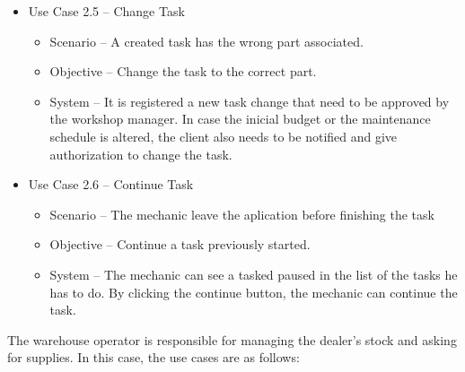 \begin{itemize}
\begin{itemize}
  \end{itemize}
  \item Use Case 2.5 – Change Task
  \begin{itemize}
    \item Scenario – A created task has the wrong part associated.
    \item Objective – Change the task to the correct part.
    \item System – It is registered a new task change that need to be approved by the workshop manager. In case the inicial budget or the maintenance schedule is altered, the client also needs to be notified and give authorization to change the task.
  \end{itemize}
    \item Use Case 2.6 – Continue Task
  \begin{itemize}
    \item Scenario – The mechanic leave the aplication before finishing the task
    \item Objective – Continue a task previously started.
    \item System – The mechanic can see a tasked paused in the list of the tasks he has to do. By clicking the continue button, the mechanic can continue the task.
  \end{itemize}
\end{itemize}
\hfill \break

The warehouse operator is responsible for managing the dealer's stock and asking for supplies. 
In this case, the use cases are as follows:

